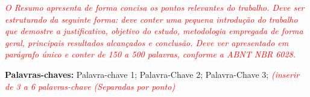 \begin{resumo}
  \noindent
  
  \textit{\textcolor{red}{O Resumo apresenta de forma concisa os pontos relevantes do trabalho. Deve ser estruturado da seguinte forma:  deve conter uma pequena introdução do trabalho que demostre a justificativa, objetivo do estudo, metodologia empregada de forma geral, principais resultados alcançados e conclusão. Deve ver apresentado em parágrafo único e conter de 150 a 500 palavras, conforme a ABNT NBR 6028.}}
  
  \hfill \break
  \textbf{Palavras-chaves:} Palavra-chave 1; Palavra-Chave 2; Palavra-Chave 3; \textit{\textcolor{red}{(inserir de 3 a 6 palavras-chave (Separadas por ponto)}}
\end{resumo}